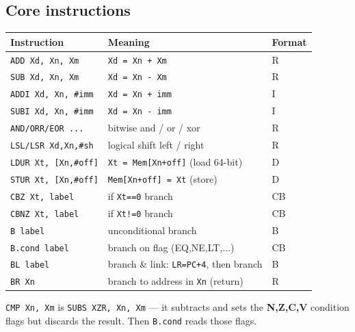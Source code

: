 \documentclass[10pt]{article}
\newcommand{\code}[1]{\texttt{\small #1}}
\begin{document}
\subsection{Core instructions}
\begin{center}
\renewcommand{\arraystretch}{1.15}
\begin{tabular}{@{}l l l@{}}
\toprule
\textbf{Instruction} & \textbf{Meaning} & \textbf{Format}\\
\midrule
\code{ADD Xd, Xn, Xm}      & \code{Xd = Xn + Xm}                       & R\\
\code{SUB Xd, Xn, Xm}      & \code{Xd = Xn - Xm}                       & R\\
\code{ADDI Xd, Xn, \#imm}  & \code{Xd = Xn + imm}                      & I\\
\code{SUBI Xd, Xn, \#imm}  & \code{Xd = Xn - imm}                      & I\\
\code{AND/ORR/EOR ...}     & bitwise and / or / xor                    & R\\
\code{LSL/LSR Xd,Xn,\#sh}  & logical shift left / right                & R\\
\code{LDUR Xt, [Xn,\#off]} & \code{Xt = Mem[Xn+off]} (load 64-bit)     & D\\
\code{STUR Xt, [Xn,\#off]} & \code{Mem[Xn+off] = Xt} (store)           & D\\
\code{CBZ Xt, label}       & if \code{Xt==0} branch                    & CB\\
\code{CBNZ Xt, label}      & if \code{Xt!=0} branch                    & CB\\
\code{B label}             & unconditional branch                      & B\\
\code{B.cond label}        & branch on flag (EQ,NE,LT,...)             & CB\\
\code{BL label}            & branch \& link: \code{LR=PC+4}, then branch & B\\
\code{BR Xn}               & branch to address in \code{Xn} (return)   & R\\
\bottomrule
\end{tabular}
\end{center}

\begin{tipbox}[Conditionals]
\code{CMP Xn, Xm} is \code{SUBS XZR, Xn, Xm} --- it subtracts and sets the
\textbf{N,Z,C,V} condition flags but discards the result. Then \code{B.cond} reads those flags.
\end{tipbox}
\end{document}
